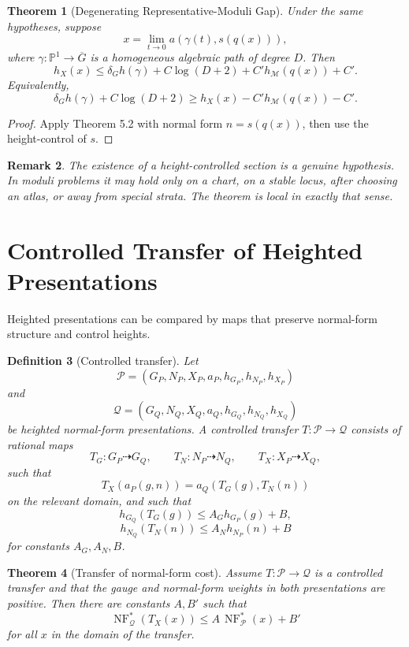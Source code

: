 \documentclass[11pt]{article}
\newtheorem{theorem}{Theorem}[section]
\newtheorem{definition}[theorem]{Definition}
\newtheorem{remark}[theorem]{Remark}
\DeclareMathOperator{\NF}{NF}
\begin{document}
\begin{theorem}[Degenerating Representative-Moduli Gap]
Under the same hypotheses, suppose
\[
x=\lim_{t\to0}a(\gamma(t),s(q(x))),
\]
where \(\gamma:\mathbb P^1\to\overline G\) is a homogeneous algebraic path of degree \(D\). Then
\[
h_X(x)
\leq
\delta_G h(\gamma)+C\log(D+2)
+C' h_{\mathcal M}(q(x))+C'.
\]
Equivalently,
\[
\delta_G h(\gamma)+C\log(D+2)
\geq
h_X(x)-C' h_{\mathcal M}(q(x))-C'.
\]
\end{theorem}

\begin{proof}
Apply Theorem 5.2 with normal form \(n=s(q(x))\), then use the height-control of \(s\).
\end{proof}

\begin{remark}
The existence of a height-controlled section is a genuine hypothesis. In moduli problems it may hold only on a chart, on a stable locus, after choosing an atlas, or away from special strata. The theorem is local in exactly that sense.
\end{remark}

\section{Controlled Transfer of Heighted Presentations}

Heighted presentations can be compared by maps that preserve normal-form structure and control heights.

\begin{definition}[Controlled transfer]
Let
\[
\mathcal P=(G_P,N_P,X_P,a_P,h_{G_P},h_{N_P},h_{X_P})
\]
and
\[
\mathcal Q=(G_Q,N_Q,X_Q,a_Q,h_{G_Q},h_{N_Q},h_{X_Q})
\]
be heighted normal-form presentations. A controlled transfer \(T:\mathcal P\to\mathcal Q\) consists of rational maps
\[
T_G:G_P\dashrightarrow G_Q,
\qquad
T_N:N_P\dashrightarrow N_Q,
\qquad
T_X:X_P\dashrightarrow X_Q,
\]
such that
\[
T_X(a_P(g,n))=a_Q(T_G(g),T_N(n))
\]
on the relevant domain, and such that
\[
h_{G_Q}(T_G(g))\leq A_G h_{G_P}(g)+B,
\]
\[
h_{N_Q}(T_N(n))\leq A_N h_{N_P}(n)+B
\]
for constants \(A_G,A_N,B\).
\end{definition}

\begin{theorem}[Transfer of normal-form cost]
Assume \(T:\mathcal P\to\mathcal Q\) is a controlled transfer and that the gauge and normal-form weights in both presentations are positive. Then there are constants \(A,B'\) such that
\[
\NF_{\mathcal Q}^{\ast}(T_X(x))
\leq
A\,\NF_{\mathcal P}^{\ast}(x)+B'
\]
for all \(x\) in the domain of the transfer.
\end{theorem}
\end{document}
